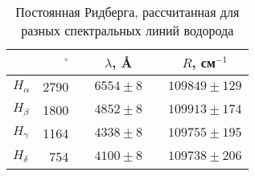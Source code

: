 \begin{table}
\centering
\caption{Постоянная Ридберга, рассчитанная для разных спектральных линий водорода}
\label{tab:ridbergs}
\begin{tabular}{lrcccc}
\toprule
{} &    $^\circ$ & {} &  $\lambda$, Å & {} & $R$, см$^{-1}$ \\
\midrule
$H_\alpha$ &  2790 & {} & $6554 \pm 8$ & {} & $109849 \pm 129$ \\
$H_\beta$  &  1800 & {} & $4852 \pm 8$ & {} & $109913 \pm 174$ \\
$H_\gamma$ &  1164 & {} & $4338 \pm 8$ & {} & $109755 \pm 195$ \\
$H_\delta$ &   754 & {} & $4100 \pm 8$ & {} & $109738 \pm 206$ \\
\bottomrule
\end{tabular}
\end{table}
